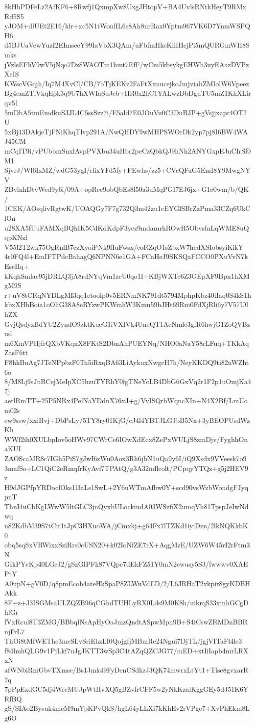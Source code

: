 8kHhPDFeLz2AfKF6+8Rwfj1QxmpXw8UxgJHtopV+BA4UvlsRNtkHeyT9RMxRd5S5
yJOM+dlUEt2E16/klr+xc5N1tWonlIL6s8Ah8nrRax0Yptm967VK6D7YnmWSPQH6
d5BJUaVewYuzI2EImsecY99IaVbX3QAm/uFbfmHkeKliIHcjPi5mQURGmWH8Smks
jVzlsEFhV9wV5jNqo7Dz8WAOTm1hmt7EfF/wCm5kbsykgEHWh3uyEAazDVPzXeIS
KWscVGqjh/Iq7M4XvCl/CB/7bTjKEKz2FaFtXxnucejkoJmjviahZMIolW6Vpeez
Bg4cmZTlVkqEpk3q9U7hXWIaSuJcb+HR0x2hC1YALwzDbDguTU5mZ1KhXLirqv51
5mDbA5tmEmdkuSJJL4C5ssSzz7i/E5ald7E0JOuVu0C3DuBJP+gVsjjxapr4OT2U
5xBj43DAkjeTjFNiKhqTlvp291A/NwQHDY9wMHPSWOrDk2yp7pj8I6BW4WAJ45CM
mCqIT9i/vPUbbmSnxlAvpPVXbu34uHbr2peCzQbkQJ9hNh2ANYGxpEJnCIrSf0M1
SjvrJ/Wl6IxMZ/wdG53ygI/rlixYFd5fy+FEwhs/zz5+CVcQFuG5EmI8Y9MwgNYV
ZBvlnhDtvWed9y6i/09A+opRec9obQbEs8l50a3uMqPGI7EJ6jx+G1e0wm/b/QK/
1CEK/AOsqlivRgtwK/UOAQGy7F7g732Q3m42zu1cEYGlSBrZzPma33CZq6UkClOn
u28XA5fUuFAMXqBQhIK5CdKdKdpF3yez9mdamrhROwR5ObvsfnLqWME8uQqpKNzl
V55l2T2wk75OgRnlB7ezXyoiPNk9fIuFwsx/eoRZqO1sZbxW7hcdXSIobsyiKikY
4r0FQ4l+EmIFTPdcBahagQ6NPNN6e1GA+FCaHeJ9SKSQaFCCO0PXuVvN7kEseHq+
kKqhSmlac95jDRLQ3jA8rdNYqVm1zeU0qo1I+KBjWXTe6Z3GEpXF9Bpn1hXMgM9S
r+uV8tCRqNYDLgMI3qq1etoolp0v5ERNmNK791dt5794MphpKbz40iIaq0S4kS1h
kbxXHbBoia1oOliG38A8eRYzwPKWmhW3Kmn59bJHt69Rm0FdXjRli6y7V57U0hZX
GvjQsdyzBdYU2ZyndO9zktKueG1iVXIVk4UneQT1AeNmle3gfR6hwjG1ZoQVBzud
m6XmVPHjfrQXbVKqnX8FKtS2DbnAhPUEYNq/NHO0aNaY58rLFuq+TKkAqZasF6tt
F8hkBuAg7JTeNPpbzF0Tn5iRxqBA63LiAykuxNwgcH7h/NeyKKDQ9ti82nWZht6o
8/M8Lj9sJnBCejMeIpXC5hzuTYRhY0fgTNeYcLB4DbG6GxVq2r1F2p1uOmjKa47j
aetlRmTT+25P5NRx4PelNaYDdnX76xJ+g/VvISQrbWqncXIn+N4X2Bf/LmUom02s
ew9ssw/xxiHvj+DbPsLy/5TY8ry01KjG/cJ4l4YBTJLGJbB5Nx+3yBEOPUsdWzKh
WWf2ih0XULbpIov5oHWv97CWrCe6IOwXdEcx8ZePxWULjS8zmDjv/FyghhOnaKUI
ZAOScaMR8c7IGh5PiS7gJwI6zWu0Aox3Rh6jbN1uQa9y6I/iQ9Xsdx9VVeesk7o9
3mafSo+LC1QiC2eRmqfrKyAvf7TPAtQ/g3A32ndlcolt/PCpqyYTQz+g5j2HEV9z
H9dJGPfpYRDoclOks1l3aLs1SwL+2Y6uWTmAfbw0Y+scd90vsWzbWondgFJyqpnT
ThnI4uCbKgLWwW5ltGLC3jnQyxbULockiudA03WSzfiX2umqVh81TpspJeIwNdwq
n82KdbM39S7tCit1tJpC3HXuoWA/jCmxkj+g64Fx7lTZKd1iyiDzn/2lkNQKkbK0
obq5sqSxVRWixxSziRrs0cUSN20+k02IoNfZE7rX+AqgMzE/UZW6W45rI2rFtm3N
GIkPYvKp40LGcJ2/gSzGIPFk87VQpe7dEkFZ51Y0mN2cwusy5S3/fwwwv0XAEPtY
A0upN+gV0D/q8pmEcoh4ateHkSpaP8ZLWuVdED/2/L6JRHaT2vkpir8gyKDBHAkk
8F+z+J3ISGMsaULZQZB96qCGhdTUHLyRX0Lds9M0K8h/uikrqS33xinhGCgDhlGr
fVxRcul8T3ZMG/BBbqlNsApHyOaJmzQndtASpwMpn9B+S4iCswZRMDnBBRnjFrL7
ThOi8tMfWEThc3meSLvSriEhzLI0QojgfjMBmRe24Ngui7DjTL/jgjVITaFl4lc3
f84lmhQLG9v1PjLkf7uJgJKTT3wSp3C4tAZqQZCJG77/mED+xtIiIapb4mrLRXxN
afWNbiRmGbvTXmse/Bs1Jmk49FyDenCSdkzJ3QK74mwrxLtYt1+Tlse8gvxarR7q
7pPpExdGC5dj4WrcMUJpWtHvXQ5gBZvfrCFF5w2yNkKzalKggGEy5dJ51K6YRfBQ
gS/SIAo2Bysuk4meM9mYpKPvQkS/hgL64yLLXi7kKhEv2rVPge7+XvPhEkm8Lg6O
